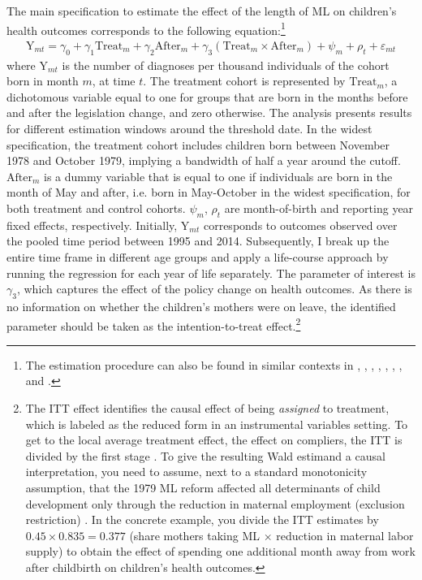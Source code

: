 The main specification to estimate the effect of the length of ML on children's health outcomes corresponds to the following equation:\footnote{The estimation procedure can also be found in similar contexts in \cite{RafaelLaliveandJosefZweimuller2009}, \cite{Dustmann2012}, \cite{Ekberg2013parental}, \cite{schonberg2014expansions}, \cite{Lalive2014}, \cite{danzer2017}, \cite{avdic2018modern}, and \cite{Huebener2017}.} %
\begin{align}
\text{Y}_{mt} = \gamma_0 + \gamma_1 \text{Treat}_{m} + \gamma_2 \text{After}_{m} + \gamma_3 (\text{Treat}_{m} \times \text{After}_{m}) + \psi_m + \rho_t + \varepsilon_{mt} \label{eq_mlch:DD_basline}
\end{align}
where $\text{Y}_{mt}$ is the number of diagnoses per thousand individuals of the cohort born in month $m$, at time $t$. The treatment cohort is represented by $\text{Treat}_{m}$, a dichotomous variable equal to one for groups that are born in the months before and after the legislation change, and zero otherwise. The analysis presents results for different estimation windows around the threshold date. In the widest specification, the treatment cohort includes children born between November 1978 and October 1979, implying a bandwidth of half a year around the cutoff. $\text{After}_{m}$ is a dummy variable that is equal to one if individuals are born in the month of May and after, i.e. born in May-October in the widest specification, for both treatment and control cohorts. $\psi_m$, $\rho_t$ are month-of-birth and reporting year fixed effects, respectively. Initially, $\text{Y}_{mt}$ corresponds to outcomes observed over the pooled time period between 1995 and 2014. Subsequently, I break up the entire time frame in different age groups and apply a life-course approach by running the regression for each year of life separately. The parameter of interest is $\gamma_3$, which captures the effect of the policy change on health outcomes. As there is no information on whether the children's mothers were on leave, the identified parameter should be taken as the intention-to-treat effect.\footnote{The ITT effect identifies the causal effect of being \textit{assigned} to treatment, which is labeled as the reduced form in an instrumental variables setting. To get to the local average treatment effect, the effect on compliers, the ITT is divided by the first stage \citep{angrist2009mostly}. To give the resulting Wald estimand a causal interpretation, you need to assume, next to a standard monotonicity assumption, that the 1979 ML reform affected all determinants of child development only through the reduction in maternal employment (exclusion restriction) \citep{Dustmann2012}. In the concrete example, you divide the ITT estimates by $0.45\times0.835=0.377$ (share mothers taking ML $\times$ reduction in maternal labor supply) to obtain the effect of spending one additional month away from work after childbirth on children's health outcomes.} 

